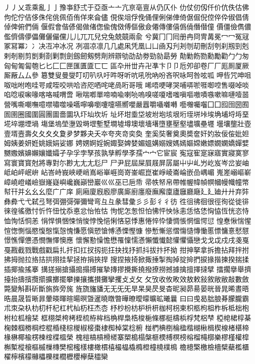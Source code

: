 ⼃丿乂乖乘亂⼅亅豫亊舒弍于亞亟⼇亠亢亰亳亶从仍仄仆
仂仗仞仭仟价伉佚估佛佝佗佇佶侈侏侘佻佩佰侑佯來侖儘
俔俟俎俘俛俑俚俐俤俥倚倨倔倪倥倅伜俶倡倩倬俾俯們倆
偃假會偕偐偈做偖偬偸傀傚傅傴傲僉僊傳僂僖僞僥僭僣僮
價僵儉儁儂儖儕儔儚儡儺儷儼儻⼉儿⺎兀兒兌兔兢竸兩兪
兮冀⼌冂囘册冉冏冑冓冕⼍冖冤冦冢冩冪⼎冫决冱冲冰况
冽凅凉凛⼏几處凩凭凰⼐凵凾刄刋刔刎刧刪刮刳刹剏剄剋
剌剞剔剪剴剩剳剿剽劍劔劒剱劈劑辨辧劬劭劼劵勁勍勗勞
勣勦飭勠勳勵勸⼓勹匆匈甸匍匐匏匕⼔匚⼕匣匯匱匳⼖匸
區卆卅丗卉卍凖卞⼙卩卮夘卻卷⼚厂厖厠厦厥厮厰⼛厶參
簒雙叟曼燮叮叨叭叺吁吽呀听吭吼吮吶吩吝呎咏呵咎呟呱
呷呰咒呻咀呶咄咐咆哇咢咸咥咬哄哈咨咫哂咤咾咼哘哥哦
唏唔哽哮哭哺哢唹啀啣啌售啜啅啖啗唸唳啝喙喀咯喊喟啻
啾喘喞單啼喃喩喇喨嗚嗅嗟嗄嗜嗤嗔嘔嗷嘖嗾嗽嘛嗹噎噐
營嘴嘶嘲嘸噫噤嘯噬噪嚆嚀嚊嚠嚔嚏嚥嚮嚶嚴囂嚼囁囃囀
囈囎囑囓⼞囗囮囹圀囿圄圉圈國圍圓團圖嗇圜圦圷圸坎圻
址坏坩埀垈坡坿垉垓垠垳垤垪垰埃埆埔埒埓堊埖埣堋堙堝
塲堡塢塋塰毀塒堽塹墅墹墟墫墺壞墻墸墮壅壓壑壗壙壘壥
壜壤壟壯壺壹壻壼壽夂⼡夊⼢夐夛梦夥夬夭夲夸夾竒奕奐
奎奚奘奢奠奧奬奩奸妁妝佞侫妣妲姆姨姜妍姙姚娥娟娑娜
娉娚婀婬婉娵娶婢婪媚媼媾嫋嫂媽嫣嫗嫦嫩嫖嫺嫻嬌嬋嬖
嬲嫐嬪嬶嬾孃孅孀孑孕孚孛孥孩孰孳孵學斈孺⼧宀它宦宸
寃寇寉寔寐寤實寢寞寥寫寰寶寳尅將專對尓尠⺐⼪尢尨⼫
尸尹屁屆屎屓屐屏孱屬⼬屮乢屶屹岌岑岔妛岫岻岶岼岷峅
岾峇峙峩峽峺峭嶌峪崋崕崗嵜崟崛崑崔崢崚崙崘嵌嵒嵎嵋
嵬嵳嵶嶇嶄嶂嶢嶝嶬嶮嶽嶐嶷嶼巉巍巓巒巖⼮巛巫已巵帋
帚帙帑帛帶帷幄幃幀幎幗幔幟幢幤幇幵并⺓⼳幺麼⼴广庠
廁廂廈廐廏廖廣廝廚廛廢廡廨廩廬廱廳廰⼵廴廸⼶廾弃弉
彝彜⼷弋弑弖弩弭弸彁彈彌彎弯⺔彑彖彗彙⼺彡彭⼻彳彷
徃徂彿徊很徑徇從徙徘徠徨徭徼忖忻忤忸忱忝悳忿怡恠怙
怐怩怎怱怛怕怫怦怏怺恚恁恪恷恟恊恆恍恣恃恤恂恬恫恙
悁悍惧悃悚悄悛悖悗悒悧悋惡悸惠惓悴忰悽惆悵惘慍愕愆
惶惷愀惴惺愃愡惻惱愍愎慇愾愨愧慊愿愼愬愴愽慂慄慳慷
慘慙慚慫慴慯慥慱慟慝慓慵憙憖憇憬憔憚憊憑憫憮懌懊應
懷懈懃懆憺懋罹懍懦懣懶懺懴懿懽懼懾戀⼽戈戉戍戌戔戛
戞戡截戮戰戲戳扁扎扞扣扛扠扨扼抂抉找抒抓抖拔抃抔拗
拑抻拏拿拆擔拈拜拌拊拂拇抛拉挌拮拱挧挂挈拯拵捐挾捍
搜捏掖掎掀掫捶掣掏掉掟掵捫捩掾揩揀揆揣揉插揶揄搖搴
搆搓搦搶攝搗搨搏摧摯摶摎攪撕撓撥撩撈撼據擒擅擇撻擘
擂擱擧舉擠擡抬擣擯攬擶擴擲擺攀擽攘攜攅攤攣攫⽁攴⺙
攵攷收攸畋效敖敕敍敘敞敝敲數斂斃變斛斟斫斷旃旆旁旄
旌旒旛旙⽆无⺛旡旱杲昊昃旻杳昵昶昴昜晏晄晉晁晞晝晤
晧晨晟晢晰暃暈暎暉暄暘暝曁暹曉暾暼曄暸曖曚曠昿曦曩
⽈曰曵曷朏朖朞朦朧霸朮朿朶杁朸朷杆杞杠杙杣杤枉杰枩
杼杪枌枋枦枡枅枷柯枴柬枳柩枸柤柞柝柢柮枹柎柆柧檜栞
框栩桀桍栲桎梳栫桙档桷桿梟梏梭梔條梛梃檮梹桴梵梠梺
椏梍桾椁棊椈棘椢椦棡椌棍棔棧棕椶椒椄棗棣椥棹棠棯椨
椪椚椣椡棆楹楷楜楸楫楔楾楮椹楴椽楙椰楡楞楝榁楪榲榮
槐榿槁槓榾槎寨槊槝榻槃榧樮榑榠榜榕榴槞槨樂樛槿權槹
槲槧樅榱樞槭樔槫樊樒櫁樣樓橄樌橲樶橸橇橢橙橦橈樸樢
檐檍檠檄檢檣檗蘗檻櫃櫂檸檳檬櫞櫑櫟檪櫚櫪櫻欅蘖櫺欒
